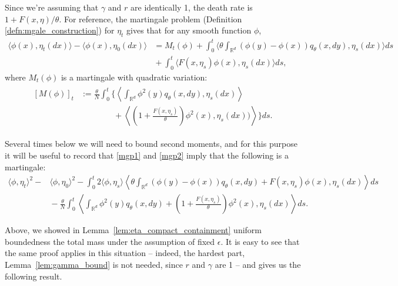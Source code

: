 \documentclass[12pt]{article}
\newcommand{\IR}{\mathbb R}
\begin{document}
Since we're assuming that $\gamma$ and $r$ are identically 1,
the death rate is $1 + F(x, \eta) / \theta$.
For reference,
the martingale problem (Definition \ref{defn:mgale_construction})
for $\eta_t$ gives that for any smooth function $\phi$,
\begin{align} \label{mgp1}
    \langle \phi(x), \eta_{t}(dx) \rangle
    -
    \langle \phi(x), \eta_{0}(dx)\rangle
    &= \nonumber
    M_t(\phi)
    +
    \int_{0}^{t} \langle \theta \int_{\IR^d}
            \left( \phi(y) -\phi(x) \right)
        q_\theta(x,dy), \eta_s(dx)
    \rangle ds
    \\ & {}
    +
    \int_0^t \langle
        F(x, \eta_s) \phi(x),
        \eta_s(dx)
    \rangle ds ,
\end{align}
where $M_t(\phi)$ is a martingale with quadratic variation:
\begin{align} \label{mgp2}
    \begin{split}
[ M(\phi) ]_t
    &:=
    \frac{\theta}{N}
    \int_{0}^{t} \bigg\{
        \left\langle \int_{\IR^d} \phi^2(y) q_\theta(x,dy), \eta_s(dx) \right\rangle
    \\
    & \qquad \qquad {} +
    \left\langle \left(1 + \frac{F(x, \eta_s)}{\theta } \right)
        \phi^2(x), \eta_s(dx)) \right\rangle 
    \bigg\} ds. 
    \end{split}
\end{align}

Several times below we will need to bound second moments,
and for this purpose it will be useful to record that \eqref{mgp1} and \eqref{mgp2}
imply that the following is a martingale:
\begin{align} \label{mgp3}
    \nonumber
    \langle \phi, \eta_t \rangle^2
    -
    & \langle \phi, \eta_0 \rangle^2
    -
    \int_0^t
        2 \langle \phi, \eta_s \rangle
        \left\langle
            \theta \int_{\IR^d} (\phi(y) - \phi(x)) q_\theta(x, dy)
            + F(x, \eta_s) \phi(x),
            \eta_s(dx)
        \right\rangle
    ds
    \\ & {}
    -
    \frac{\theta}{N}
    \int_0^t
        \left\langle
            \int_{\IR^d} \phi^2(y) q_\theta(x, dy)
            +
            \left(1 + \frac{F(x, \eta_s)}{\theta}\right) \phi^2(x),
            \eta_s(dx)
        \right\rangle
    ds .
\end{align}

Above, we showed in Lemma~\ref{lem:eta_compact_containment}
uniform boundedness the total mass under the assumption of fixed $\epsilon$.
It is easy to see that the same proof applies
in this situation -- indeed, the hardest part, Lemma~\ref{lem:gamma_bound} is not needed,
since $r$ and $\gamma$ are 1 --
and gives us the following result.
\end{document}
